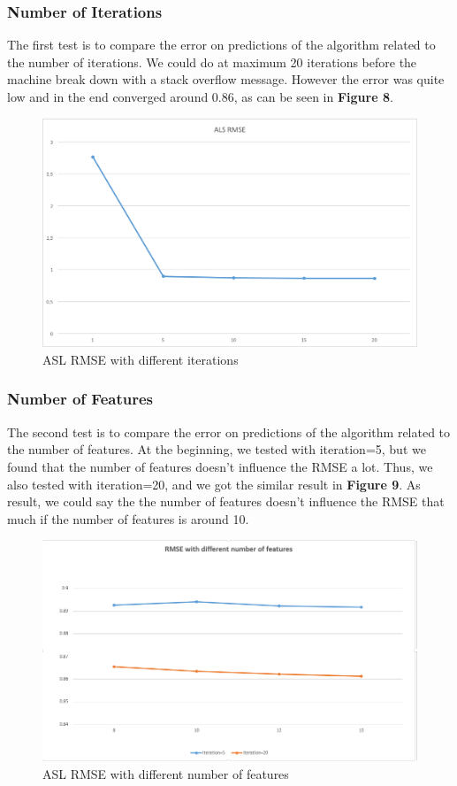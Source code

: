 \documentclass{sig-alternate-05-2015}
\begin{document}
\subsubsection{Number of Iterations}
    The first test is to compare the error on predictions of the algorithm related to the number of iterations.
        We could do at maximum 20 iterations before the machine break down with a stack overflow message. However the error was quite low and in the end converged around 0.86, as can be seen in \textbf{Figure 8}.
\begin{figure}
    \caption{ASL RMSE with different iterations}
    \centering
    \includegraphics[scale=0.4]{alsrmse.png}
\end{figure}
\subsubsection{Number of Features}
    The second test is to compare the error on predictions of the algorithm related to the number of features.
        At the beginning, we tested with iteration=5, but we found that the number of features doesn't influence the RMSE a lot. Thus, we also tested with iteration=20, and we got the similar result in \textbf{Figure 9}. As result, we could say the the number of features doesn't influence the RMSE that much if the number of features is around 10.
        \begin{figure}
    \caption{ASL RMSE with different number of features}
    \centering
    \includegraphics[scale=0.4]{alsfeature.png}
\end{figure}
\end{document}
